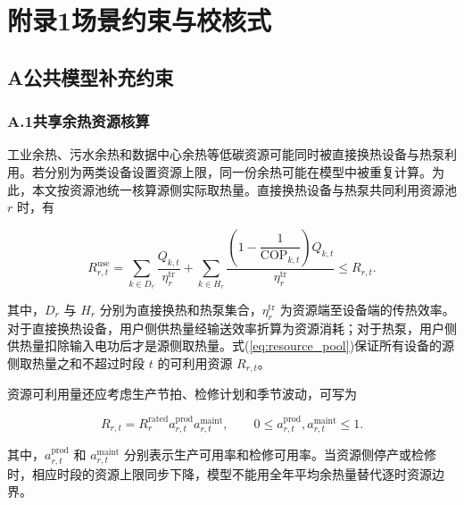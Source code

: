 \clearpage
\section*{附录1\quad 场景约束与校核式}
{}
\renewcommand{\thechaptertwosupplement}{1.\Alph{chaptertwosupplement}}
\subsection*{A\quad 公共模型补充约束}
\label{app:common}

\subsubsection*{A.1\quad 共享余热资源核算}

工业余热、污水余热和数据中心余热等低碳资源可能同时被直接换热设备与热泵利用。若分别为两类设备设置资源上限，同一份余热可能在模型中被重复计算。为此，本文按资源池统一核算源侧实际取热量。直接换热设备与热泵共同利用资源池 $r$ 时，有

\begin{equation}
R_{r,t}^{\mathrm{use}}
=\sum_{k\in D_r}\frac{Q_{k,t}}{\eta_r^{\mathrm{tr}}}
+\sum_{k\in H_r}
\frac{\left(1-\dfrac{1}{\mathrm{COP}_{k,t}}\right)Q_{k,t}}
{\eta_r^{\mathrm{tr}}}
\leq R_{r,t}.
\label{eq:resource_pool}
\end{equation}

其中，$D_r$ 与 $H_r$ 分别为直接换热和热泵集合，$\eta_r^{\mathrm{tr}}$ 为资源端至设备端的传热效率。对于直接换热设备，用户侧供热量经输送效率折算为资源消耗；对于热泵，用户侧供热量扣除输入电功后才是源侧取热量。式(\ref{eq:resource_pool})保证所有设备的源侧取热量之和不超过时段 $t$ 的可利用资源 $R_{r,t}$。

资源可利用量还应考虑生产节拍、检修计划和季节波动，可写为

\begin{equation}
R_{r,t}=R_r^{\mathrm{rated}}a_{r,t}^{\mathrm{prod}}a_{r,t}^{\mathrm{maint}},
\qquad
0\leq a_{r,t}^{\mathrm{prod}},a_{r,t}^{\mathrm{maint}}\leq1.
\label{eq:resource_availability}
\end{equation}

其中，$a_{r,t}^{\mathrm{prod}}$ 和 $a_{r,t}^{\mathrm{maint}}$ 分别表示生产可用率和检修可用率。当资源侧停产或检修时，相应时段的资源上限同步下降，模型不能用全年平均余热量替代逐时资源边界。

